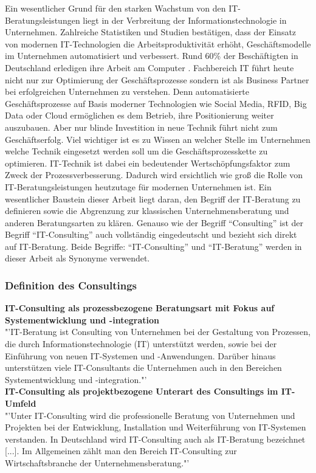 		Ein wesentlicher Grund für den starken Wachstum von den IT-Beratungsleistungen liegt in der Verbreitung der Informationstechnologie in Unternehmen. Zahlreiche Statistiken und Studien bestätigen, dass der Einsatz von modernen IT-Technologien die Arbeitsproduktivität erhöht, Geschäftsmodelle im Unternehmen automatisiert und verbessert. Rund 60\% der Beschäftigten in Deutschland  erledigen ihre Arbeit am Computer \cite{IreneBertschek.2011}.
		Fachbereich IT führt heute nicht nur zur Optimierung der Geschäftsprozesse sondern ist als Business Partner bei erfolgreichen Unternehmen zu verstehen. Denn automatisierte Geschäftsprozesse auf Basis moderner Technologien wie Social Media, RFID, Big Data oder Cloud  ermöglichen es dem Betrieb, ihre Positionierung weiter auszubauen.
		Aber nur blinde Investition in neue Technik führt nicht zum Geschäftserfolg. Viel wichtiger ist es zu Wissen an welcher Stelle im Unternehmen welche Technik eingesetzt werden soll um die Geschäftsprozesskette zu optimieren. IT-Technik ist dabei ein bedeutender Wertschöpfungsfaktor zum Zweck der Prozessverbesserung.
		Dadurch wird ersichtlich wie groß die Rolle von IT-Beratungsleistungen heutzutage  für modernen Unternehmen ist. Ein wesentlicher Baustein dieser Arbeit liegt daran, den Begriff der IT-Beratung  zu definieren sowie die Abgrenzung zur klassischen Unternehmensberatung und anderen Beratungsarten  zu klären.
		Genauso wie der Begriff “Consulting” ist der Begriff “IT-Consulting” auch vollständig eingedeutscht und bezieht sich direkt auf IT-Beratung. Beide Begriffe: “IT-Consulting” und “IT-Beratung” werden in dieser Arbeit als Synonyme verwendet.\\
		\subsubsection{Definition des Consultings}
		\textbf{IT-Consulting als prozessbezogene Beratungsart mit Fokus auf Systementwicklung und -integration}\\
			"'IT-Beratung ist Consulting von Unternehmen bei der Gestaltung von Prozessen, die durch Informationstechnologie (IT) unterstützt werden, sowie bei der Einführung von neuen IT-Systemen und -Anwendungen. Darüber hinaus unterstützen viele IT-Consultants die Unternehmen auch in den Bereichen Systementwicklung und -integration."' \cite[208]{ReinekeBock200709}\\
			
		\textbf{ IT-Consulting als  projektbezogene Unterart des Consultings im IT-Umfeld}\\
			"'Unter IT-Consulting wird die professionelle Beratung von Unternehmen und Projekten bei der Entwicklung, Installation und Weiterführung von IT-Systemen verstanden. In Deutschland wird IT-Consulting auch als IT-Beratung bezeichnet [...]. Im Allgemeinen zählt man den Bereich IT-Consulting zur Wirtschaftsbranche der Unternehmensberatung."'
			\cite{statistaITCons}
